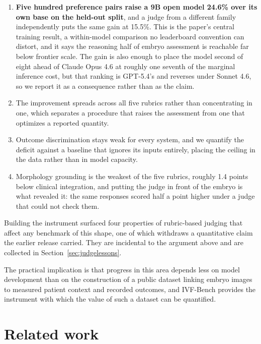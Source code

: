 \documentclass[11pt]{article}
\begin{document}
\begin{enumerate}
\item \textbf{Five hundred preference pairs raise a 9B open model 24.6\% over its
      own base on the held-out split}, and a judge from a different family
      independently puts the same gain at 15.5\%. This is the paper's central
      training result, a within-model comparison no leaderboard convention can
      distort, and it says the reasoning half of embryo assessment is reachable
      far below frontier scale. The gain is also enough to place the model second
      of eight ahead of Claude Opus 4.6 at roughly one seventh of the marginal
      inference cost, but that ranking is GPT-5.4's and reverses under Sonnet 4.6,
      so we report it as a consequence rather than as the claim.
\item The improvement spreads across all five rubrics rather than concentrating
      in one, which separates a procedure that raises the assessment from one
      that optimizes a reported quantity.
\item Outcome discrimination stays weak for every system, and we quantify the
      deficit against a baseline that ignores its inputs entirely, placing the
      ceiling in the data rather than in model capacity.
\item Morphology grounding is the weakest of the five rubrics, roughly 1.4 points
      below clinical integration, and putting the judge in front of the embryo is
      what revealed it: the same responses scored half a point higher under a
      judge that could not check them.
\end{enumerate}

Building the instrument surfaced four properties of rubric-based judging that
affect any benchmark of this shape, one of which withdraws a quantitative claim
the earlier release carried. They are incidental to the argument above and are
collected in Section~\ref{sec:judgelessons}.

The practical implication is that progress in this area depends less on model
development than on the construction of a public dataset linking embryo images to
measured patient context and recorded outcomes, and IVF-Bench provides the
instrument with which the value of such a dataset can be quantified.

\section{Related work}
\end{document}
